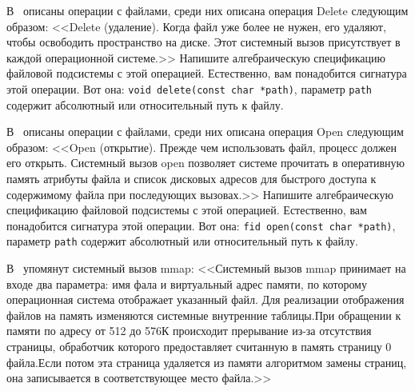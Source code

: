 \z В~\cite{tanenbaum_os} описаны операции с файлами, среди них описана операция Delete следующим образом: <<\textsf{Delete} (удаление). Когда файл уже более не нужен, его удаляют, чтобы освободить пространство на диске. Этот системный вызов присутствует в каждой операционной системе.>> Напишите алгебраическую спецификацию файловой подсистемы с этой операцией. Естественно, вам понадобится сигнатура этой операции. Вот она:  \texttt{void delete(const char *path)}, параметр \texttt{path} содержит абсолютный или относительный путь к файлу.

\z В~\cite{tanenbaum_os} описаны операции с файлами, среди них описана операция Open следующим образом: <<\textsf{Open} (открытие). Прежде чем использовать файл, процесс должен его открыть. Системный вызов open позволяет системе прочитать в оперативную память атрибуты файла и список дисковых адресов для быстрого доступа к содержимому файла при последующих вызовах.>> Напишите алгебраическую спецификацию файловой подсистемы с этой операцией. Естественно, вам понадобится сигнатура этой операции. Вот она:  \texttt{fid open(const char *path)}, параметр \texttt{path} содержит абсолютный или относительный путь к файлу.

\z В~\cite{tanenbaum_os} упомянут системный вызов mmap: <<Системный вызов mmap принимает на входе два параметра: имя фала и виртуальный адрес памяти, по которому операционная система отображает указанный файл. Для реализации отображения файлов на память изменяются системные внутренние таблицы.При обращении к памяти по адресу от 512 до 576К происходит прерывание из-за отсутствия страницы, обработчик которого предоставляет считанную в память страницу 0 файла.Если потом эта страница удаляется из памяти алгоритмом замены страниц, она записывается в соответствующее место файла.>>


%
%

